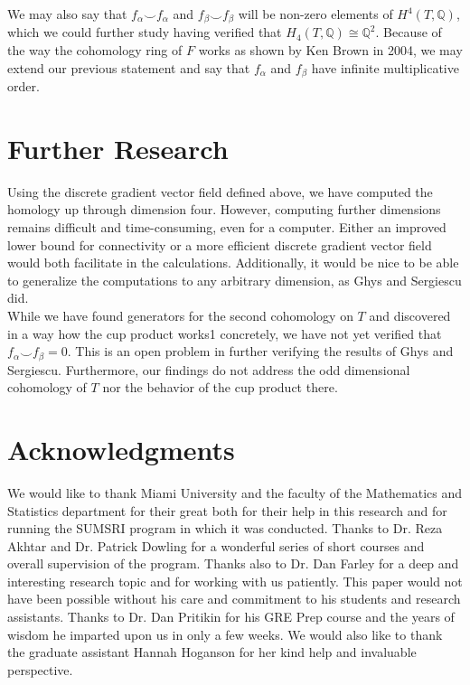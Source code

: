 \documentclass{amsart}
\newcommand{\bq}{\ensuremath{\mathbb{Q}}} %
\begin{document}
We may also say that $f_{\alpha} \smile f_{\alpha}$ and $f_{\beta} \smile f_{\beta}$ will be non-zero elements of $H^{4}(T, \bq)$, which we could further study having verified that $H_{4}(T, \bq) \cong \bq^2$. Because of the way the cohomology ring of $F$ works as shown by Ken Brown in 2004, we may extend our previous statement and say that $f_{\alpha}$ and $f_{\beta}$ have infinite multiplicative order.

\section{Further Research}
Using the discrete gradient vector field defined above, we have computed the homology up through dimension four. However, computing further dimensions remains difficult and time-consuming, even for a computer. Either an improved lower bound for connectivity or a more efficient discrete gradient vector field would both facilitate in the calculations. Additionally, it would be nice to be able to generalize the computations to any arbitrary dimension, as Ghys and Sergiescu did. \\
While we have found generators for the second cohomology on $T$ and discovered in a way how the cup product works1 concretely, we have not yet verified that $f_{\alpha} \smile f_{\beta} = 0$. This is an open problem in further verifying the results of Ghys and Sergiescu. Furthermore, our findings do not address the odd dimensional cohomology of $T$ nor the behavior of the cup product there. 

\section{Acknowledgments}

We would like to thank Miami University and the faculty of the Mathematics and Statistics department for their great both for their help in this research and for running the SUMSRI program in which it was conducted. Thanks to Dr. Reza Akhtar and Dr. Patrick Dowling for a wonderful series of short courses and overall supervision of the program. Thanks also to Dr. Dan Farley for a deep and interesting research topic and for working with us patiently. This paper would not have been possible without his care and commitment to his students and research assistants. Thanks to Dr. Dan Pritikin for his GRE Prep course and the years of wisdom he imparted upon us in only a few weeks. We would also like to thank the graduate assistant Hannah Hoganson for her kind help and invaluable perspective. 
\end{document}
